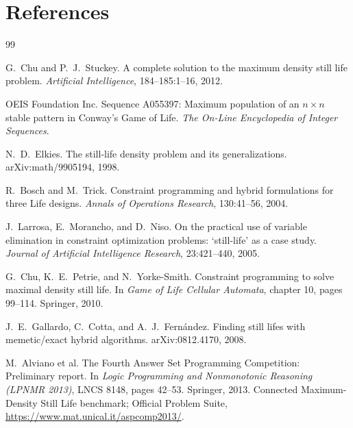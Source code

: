 \documentclass{article}
\begin{document}
\begin{ack}
\end{ack}

\section*{References}
\small
\begin{thebibliography}{99}

G.~Chu and P.~J.~Stuckey.
A complete solution to the maximum density still life problem.
\emph{Artificial Intelligence}, 184--185:1--16, 2012.

OEIS Foundation Inc.
Sequence A055397: Maximum population of an $n\times n$ stable pattern in Conway's Game of Life.
\emph{The On-Line Encyclopedia of Integer Sequences}.

N.~D.~Elkies.
The still-life density problem and its generalizations.
arXiv:math/9905194, 1998.

R.~Bosch and M.~Trick.
Constraint programming and hybrid formulations for three Life designs.
\emph{Annals of Operations Research}, 130:41--56, 2004.

J.~Larrosa, E.~Morancho, and D.~Niso.
On the practical use of variable elimination in constraint optimization problems: `still-life' as a case study.
\emph{Journal of Artificial Intelligence Research}, 23:421--440, 2005.

G.~Chu, K.~E.~Petrie, and N.~Yorke-Smith.
Constraint programming to solve maximal density still life.
In \emph{Game of Life Cellular Automata}, chapter 10, pages 99--114. Springer, 2010.

J.~E.~Gallardo, C.~Cotta, and A.~J.~Fern\'andez.
Finding still lifes with memetic/exact hybrid algorithms.
arXiv:0812.4170, 2008.

M.~Alviano et al.
The Fourth Answer Set Programming Competition: Preliminary report.
In \emph{Logic Programming and Nonmonotonic Reasoning (LPNMR 2013)}, LNCS 8148, pages 42--53. Springer, 2013.
Connected Maximum-Density Still Life benchmark; Official Problem Suite, \url{https://www.mat.unical.it/aspcomp2013/}.


\end{thebibliography}
\end{document}
